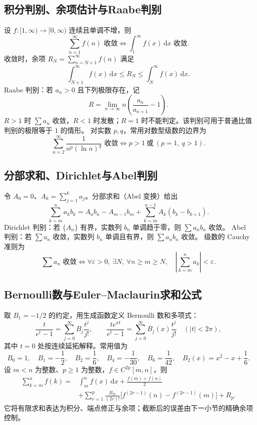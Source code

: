 \documentclass[../main.tex]{subfiles}
\begin{document}
\subsection{积分判别、余项估计与Raabe判别}
设 $f:[1,\infty)\to[0,\infty)$ 连续且单调不增，则
\[
\sum_{n=1}^\infty f(n)\text{ 收敛}
\iff\int_1^\infty f(x)\,\mathrm dx\text{ 收敛}.
\]
收敛时，余项 $R_N=\sum_{n=N+1}^\infty f(n)$ 满足
\[
\int_{N+1}^\infty f(x)\,\mathrm dx
\le R_N\le\int_N^\infty f(x)\,\mathrm dx.
\]
Raabe 判别：若 $a_n>0$ 且下列极限存在，记
\[
R=\lim_{n\to\infty}n\left(\frac{a_n}{a_{n+1}}-1\right).
\]
$R>1$ 时 $\sum a_n$ 收敛，$R<1$ 时发散；$R=1$ 时不能判定。该判别可用于普通比值判别的极限等于 $1$ 的情形。
对实数 $p,q$，常用对数型级数的边界为
\[
\sum_{n=2}^\infty\frac1{n^p(\ln n)^q}\text{ 收敛}
\iff p>1\ \text{或}\ (p=1,\ q>1).
\]
\subsection{分部求和、Dirichlet与Abel判别}
令 $A_0=0$、$A_k=\sum_{j=1}^ka_j$。分部求和（Abel 变换）给出
\[
\sum_{k=m}^na_kb_k
=A_nb_n-A_{m-1}b_m+\sum_{k=m}^{n-1}A_k(b_k-b_{k+1}).
\]
Dirichlet 判别：若 $\{A_n\}$ 有界，实数列 $b_n$ 单调趋于零，则 $\sum a_nb_n$ 收敛。
Abel 判别：若 $\sum a_n$ 收敛，实数列 $b_n$ 单调且有界，则 $\sum a_nb_n$ 收敛。
级数的 Cauchy 准则为
\[
\sum a_n\text{ 收敛}\iff
\forall\varepsilon>0,\ \exists N,\ \forall n\ge m\ge N,\quad
\left|\sum_{k=m}^na_k\right|<\varepsilon.
\]
\subsection{Bernoulli数与Euler--Maclaurin求和公式}
取 $B_1=-1/2$ 的约定，用生成函数定义 Bernoulli 数和多项式：
\[
\frac{t}{e^t-1}=\sum_{j=0}^\infty B_j\frac{t^j}{j!},\qquad
\frac{te^{xt}}{e^t-1}=\sum_{j=0}^\infty B_j(x)\frac{t^j}{j!}
\quad(|t|<2\pi),
\]
其中 $t=0$ 处按连续延拓解释。常用值为
\[
B_0=1,\quad B_1=-\frac12,\quad B_2=\frac16,\quad
B_4=-\frac1{30},\quad B_6=\frac1{42},\quad
B_2(x)=x^2-x+\frac16.
\]
设 $m<n$ 为整数、$p\ge1$ 为整数，$f\in C^{2p}[m,n]$，则
\[
\begin{aligned}
\sum_{k=m}^nf(k)
={}&\int_m^nf(x)\,\mathrm dx+\frac{f(m)+f(n)}2\\
&+\sum_{r=1}^p\frac{B_{2r}}{(2r)!}
\bigl[f^{(2r-1)}(n)-f^{(2r-1)}(m)\bigr]+R_p.
\end{aligned}
\]
它将有限求和表达为积分、端点修正与余项；截断后的误差由下一小节的精确余项控制。
\end{document}
